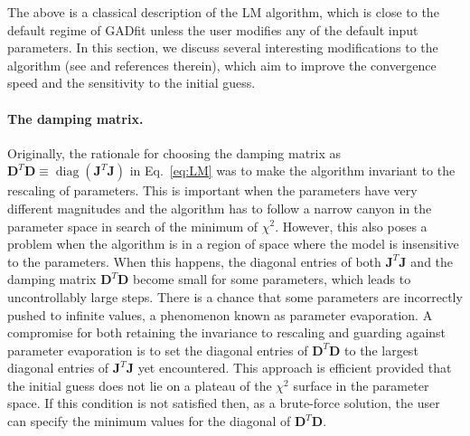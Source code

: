 \documentclass{article}
\DeclareMathOperator{\diag}{diag}
\begin{document}
The above is a classical description of the LM algorithm, which is
close to the default regime of GADfit unless the user modifies any of
the default input parameters. In this section, we discuss several
interesting modifications to the algorithm (see \cite{transtrum10,
  transtrum11, transtrum12} and references therein), which aim to
improve the convergence speed and the sensitivity to the initial
guess.

\paragraph{The damping matrix.} Originally, the rationale for choosing
the damping matrix as $\bm D^T\bm D \equiv \diag(\bm J^T\bm J)$ in
Eq.~\eqref{eq:LM} was to make the algorithm invariant to the rescaling
of parameters. This is important when the parameters have very
different magnitudes and the algorithm has to follow a narrow canyon
in the parameter space in search of the minimum of $\chi^2$. However,
this also poses a problem when the algorithm is in a region of space
where the model is insensitive to the parameters. When this happens,
the diagonal entries of both $\bm J^T\bm J$ and the damping matrix
$\bm D^T\bm D$ become small for some parameters, which leads to
uncontrollably large steps. There is a chance that some parameters are
incorrectly pushed to infinite values, a phenomenon known as parameter
evaporation. A compromise for both retaining the invariance to
rescaling and guarding against parameter evaporation is to set the
diagonal entries of $\bm D^T\bm D$ to the largest diagonal entries of
$\bm J^T\bm J$ yet encountered. This approach is efficient provided
that the initial guess does not lie on a plateau of the $\chi^2$
surface in the parameter space. If this condition is not satisfied
then, as a brute-force solution, the user can specify the minimum
values for the diagonal of $\bm D^T\bm D$.
\end{document}
